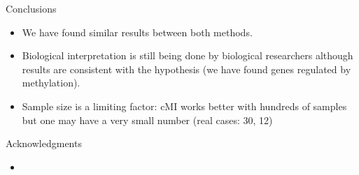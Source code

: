 \documentclass[handout]{beamer}
\begin{document}
\begin{frame}{Conclusions}
  \begin{itemize}
  \item We have found similar results between both methods.
  \item Biological interpretation is still being done by biological
    researchers although results are consistent with the hypothesis
    (we have found genes regulated by methylation).
  \item Sample size is a limiting factor: cMI works better with hundreds of samples but one may have a very small number (real cases: 30, 12)
\end{itemize}
\end{frame}

\begin{frame}{Acknowledgments}
  \begin{itemize}
  \item 
  \end{itemize}
\end{frame}
\end{document}
